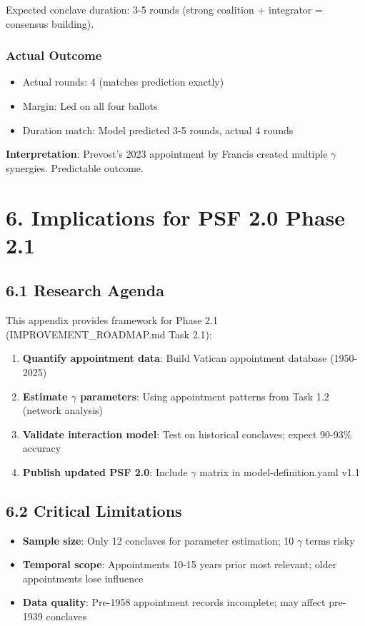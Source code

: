 \documentclass[11pt]{article}
\begin{document}
Expected conclave duration: 3-5 rounds (strong coalition + integrator = consensus building).

\subsubsection{Actual Outcome}

\begin{itemize}
\item Actual rounds: 4 (matches prediction exactly)
\item Margin: Led on all four ballots
\item Duration match: Model predicted 3-5 rounds, actual 4 rounds
\end{itemize}

\textbf{Interpretation}: Prevost's 2023 appointment by Francis created multiple $\gamma$ synergies. Predictable outcome.

\section{6. Implications for PSF 2.0 Phase 2.1}

\subsection{6.1 Research Agenda}

This appendix provides framework for Phase 2.1 (IMPROVEMENT\_ROADMAP.md Task 2.1):

\begin{enumerate}
\item \textbf{Quantify appointment data}: Build Vatican appointment database (1950-2025)
\item \textbf{Estimate $\gamma$ parameters}: Using appointment patterns from Task 1.2 (network analysis)
\item \textbf{Validate interaction model}: Test on historical conclaves; expect 90-93\% accuracy
\item \textbf{Publish updated PSF 2.0}: Include $\gamma$ matrix in model-definition.yaml v1.1
\end{enumerate}

\subsection{6.2 Critical Limitations}

\begin{itemize}
\item \textbf{Sample size}: Only 12 conclaves for parameter estimation; 10 $\gamma$ terms risky
\item \textbf{Temporal scope}: Appointments 10-15 years prior most relevant; older appointments lose influence
\item \textbf{Data quality}: Pre-1958 appointment records incomplete; may affect pre-1939 conclaves
\end{itemize}
\end{document}
